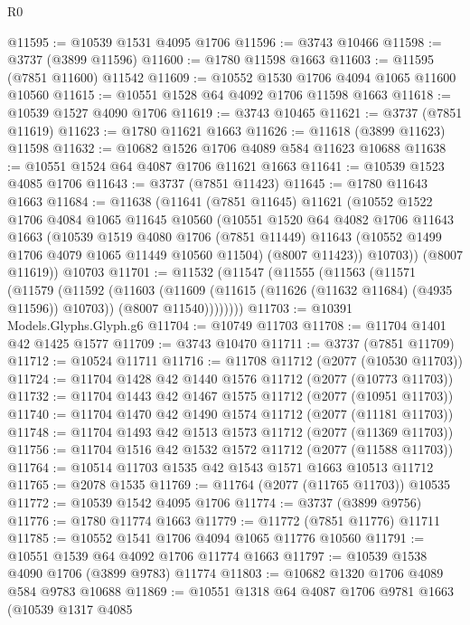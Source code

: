 \begin{lexlean}{R0}
\begin{coremodule}
@11595 := @10539 @1531 @4095 @1706
@11596 := @3743 @10466
@11598 := @3737 (@3899 @11596)
@11600 := @1780 @11598 @1663
@11603 := @11595 (@7851 @11600) @11542
@11609 := @10552 @1530 @1706 @4094 @1065 @11600 @10560
@11615 := @10551 @1528 @64 @4092 @1706 @11598 @1663
@11618 := @10539 @1527 @4090 @1706
@11619 := @3743 @10465
@11621 := @3737 (@7851 @11619)
@11623 := @1780 @11621 @1663
@11626 := @11618 (@3899 @11623) @11598
@11632 := @10682 @1526 @1706 @4089 @584 @11623 @10688
@11638 := @10551 @1524 @64 @4087 @1706 @11621 @1663
@11641 := @10539 @1523 @4085 @1706
@11643 := @3737 (@7851 @11423)
@11645 := @1780 @11643 @1663
@11684 := @11638
    (@11641
      (@7851 @11645)
      @11621
      (@10552
        @1522
        @1706
        @4084
        @1065
        @11645
        @10560
        (@10551
          @1520
          @64
          @4082
          @1706
          @11643
          @1663
          (@10539
            @1519
            @4080
            @1706
            (@7851 @11449)
            @11643
            (@10552 @1499 @1706 @4079 @1065 @11449 @10560 @11504)
            (@8007 @11423))
          @10703))
      (@8007 @11619))
    @10703
@11701 := @11532
    (@11547
      (@11555
        (@11563
          (@11571
            (@11579
              (@11592
                (@11603
                  (@11609 (@11615 (@11626 (@11632 @11684) (@4935 @11596)) @10703))
                  (@8007 @11540))))))))
@11703 := @10391 Models.Glyphs.Glyph.g6
@11704 := @10749 @11703
@11708 := @11704 @1401 @42 @1425 @1577
@11709 := @3743 @10470
@11711 := @3737 (@7851 @11709)
@11712 := @10524 @11711
@11716 := @11708 @11712 (@2077 (@10530 @11703))
@11724 := @11704 @1428 @42 @1440 @1576 @11712 (@2077 (@10773 @11703))
@11732 := @11704 @1443 @42 @1467 @1575 @11712 (@2077 (@10951 @11703))
@11740 := @11704 @1470 @42 @1490 @1574 @11712 (@2077 (@11181 @11703))
@11748 := @11704 @1493 @42 @1513 @1573 @11712 (@2077 (@11369 @11703))
@11756 := @11704 @1516 @42 @1532 @1572 @11712 (@2077 (@11588 @11703))
@11764 := @10514 @11703 @1535 @42 @1543 @1571 @1663 @10513 @11712
@11765 := @2078 @1535
@11769 := @11764 (@2077 (@11765 @11703)) @10535
@11772 := @10539 @1542 @4095 @1706
@11774 := @3737 (@3899 @9756)
@11776 := @1780 @11774 @1663
@11779 := @11772 (@7851 @11776) @11711
@11785 := @10552 @1541 @1706 @4094 @1065 @11776 @10560
@11791 := @10551 @1539 @64 @4092 @1706 @11774 @1663
@11797 := @10539 @1538 @4090 @1706 (@3899 @9783) @11774
@11803 := @10682 @1320 @1706 @4089 @584 @9783 @10688
@11869 := @10551
    @1318
    @64
    @4087
    @1706
    @9781
    @1663
    (@10539
      @1317
      @4085

\end{coremodule}
\end{lexlean}
